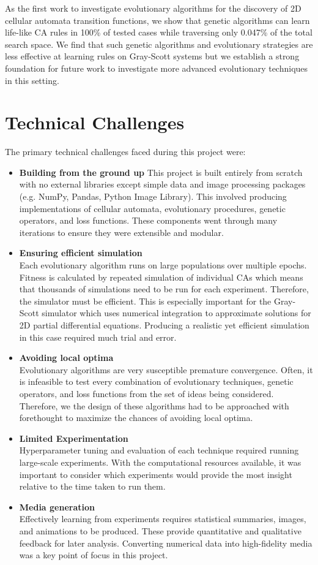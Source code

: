 As the first work to investigate evolutionary algorithms for the discovery of 2D cellular automata transition functions, we show that genetic algorithms can learn life-like CA rules in 100\% of tested cases while traversing only 0.047\% of the total search space. We find that such genetic algorithms and evolutionary strategies are less effective at learning rules on Gray-Scott systems but we establish a strong foundation for future work to investigate more advanced evolutionary techniques in this setting.

\section{Technical Challenges}
The primary technical challenges faced during this project were:
\begin{itemize}
    \item \textbf{Building from the ground up} This project is built entirely from scratch with no external libraries except simple data and image processing packages (e.g. NumPy, Pandas, Python Image Library). This involved producing implementations of cellular automata, evolutionary procedures, genetic operators, and loss functions. These components went through many iterations to ensure they were extensible and modular.\\
    \item \textbf{Ensuring efficient simulation}\\ Each evolutionary algorithm runs on large populations over multiple epochs. Fitness is calculated by repeated simulation of individual CAs which means that thousands of simulations need to be run for each experiment. Therefore, the simulator must be efficient. This is especially important for the Gray-Scott simulator which uses numerical integration to approximate solutions for 2D partial differential equations. Producing a realistic yet efficient simulation in this case required much trial and error.\\
    \item \textbf{Avoiding local optima}\\ Evolutionary algorithms are very susceptible premature convergence. Often, it is infeasible to test every combination of evolutionary techniques, genetic operators, and loss functions from the set of ideas being considered. Therefore, we the design of these algorithms had to be approached with forethought to maximize the chances of avoiding local optima.
    \item \textbf{Limited Experimentation}\\ Hyperparameter tuning and evaluation of each technique required running large-scale experiments. With the computational resources available, it was important to consider which experiments would provide the most insight relative to the time taken to run them. 
    \item \textbf{Media generation}\\ Effectively learning from experiments requires statistical summaries, images, and animations to be produced. These provide quantitative and qualitative feedback for later analysis. Converting numerical data into high-fidelity media was a key point of focus in this project.
\end{itemize}
